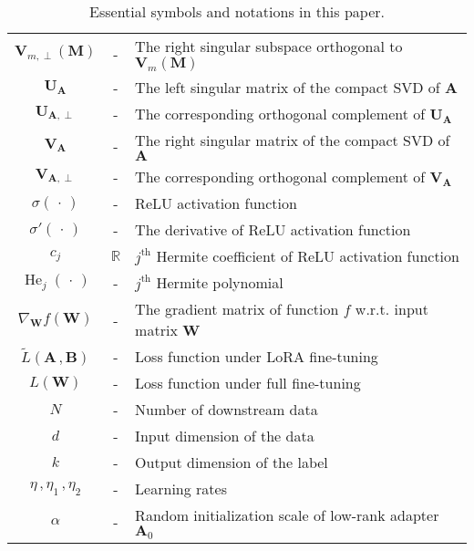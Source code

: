 \documentclass[11pt]{article}
\begin{document}
\begin{table}[h!]
\begin{tabular}{c|c|l}
$\bm V_{m,\perp}\left(\mathbf{M}\right)$ & - & The right singular subspace orthogonal to $\bm V_{m}\left(\mathbf{M}\right)$\\
$\bm U_{\bm A}$ & - & The left singular matrix of the compact SVD of $\bm A$\\
$\bm U_{\bm A, \perp}$ & - & The corresponding orthogonal complement of $\bm U_{\bm A}$\\
$\bm V_{\bm A}$ & - & The right singular matrix of the compact SVD of $\bm A$\\
$\bm V_{\bm A, \perp}$ & - & The corresponding orthogonal complement of $\bm V_{\bm A}$\\
\hline
$\sigma(\,\cdot\,)$ & - & ReLU activation function \\
$\sigma'(\,\cdot\,)$ & - & The derivative of ReLU activation function \\
$c_j$ & $\mathbb{R}$ & $j^\text{th}$ Hermite coefficient of ReLU activation function \\
$\operatorname{He}_j(\,\cdot\,)$ & - & $j^\text{th}$ Hermite polynomial\\
\hline
$\nabla_{\mathbf{W}}f\left(\mathbf{W}\right)$ & - & The gradient matrix of function $f$ w.r.t. input matrix $\mathbf{W}$\\
$\widetilde{L}\left(\bm A\,,\bm B\right)$ & - & Loss function under LoRA fine-tuning\\
$L(\bm W)$ & - & Loss function under full fine-tuning \\
\hline
$N$ & - & Number of downstream data \\
$d$ & - & Input dimension of the data \\
$k$ & - & Output dimension of the label \\
$\eta\,,\eta_1\,,\eta_2$ & - & Learning rates \\
$\alpha$ & - & Random initialization scale of low-rank adapter $\bm A_0$ \\
\hline
\end{tabular}
\caption{Essential symbols and notations in this paper.}
\label{tab:notation}
\end{table}










\end{document}
